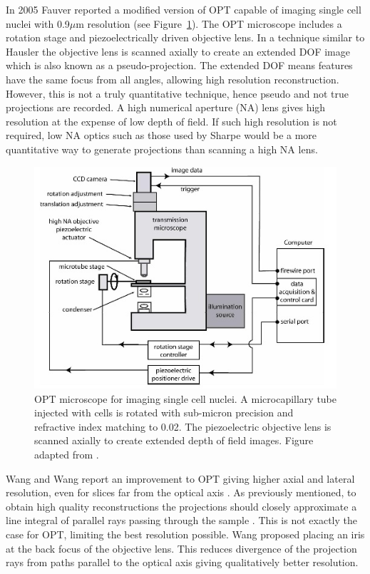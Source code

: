\documentclass[12pt]{article}
\begin{document}
In 2005 Fauver reported a modified version of OPT capable of imaging single cell nuclei with 0.9$\mu$m resolution (see Figure~\ref{fig:fauver_setup})\cite{Fauver:2005}. The OPT microscope includes a rotation stage and  piezoelectrically driven objective lens. In a technique similar to Hausler \cite{hausler1972method} the objective lens is scanned axially to create an extended DOF image which is also known as a pseudo-projection. The extended DOF means features have the same focus from all angles, allowing high resolution reconstruction. However, this is not a truly quantitative technique, hence pseudo and not true projections are recorded. A high numerical aperture (NA) lens gives high resolution at the expense of low depth of field. If such high resolution is not required, low NA optics such as those used by Sharpe would be a more quantitative way to generate  projections than scanning a high NA lens.



\begin{figure}[H]
\centering
\includegraphics[scale=0.8]{Fauver_2005_setup.jpg}
\caption{OPT microscope for imaging single cell nuclei. A microcapillary tube injected with cells is rotated with sub-micron precision and refractive index matching  to 0.02. The piezoelectric objective lens is scanned axially to create extended depth of field images. Figure adapted from \cite{Fauver:2005}.}
\label{fig:fauver_setup}
\end{figure}


Wang and Wang report an improvement to OPT giving higher axial and lateral resolution, even for slices far from the optical axis \cite{Wang:2006hy, Wang:2007}. As previously mentioned, to obtain high quality reconstructions the projections should closely approximate a line integral of parallel rays passing through the sample \cite{Wang:2006hy}. This is not exactly the case for  OPT, limiting the best resolution possible. Wang proposed placing an iris at the back focus of the objective lens. This reduces divergence of the projection rays from paths parallel to the optical axis giving qualitatively better resolution.
\end{document}
